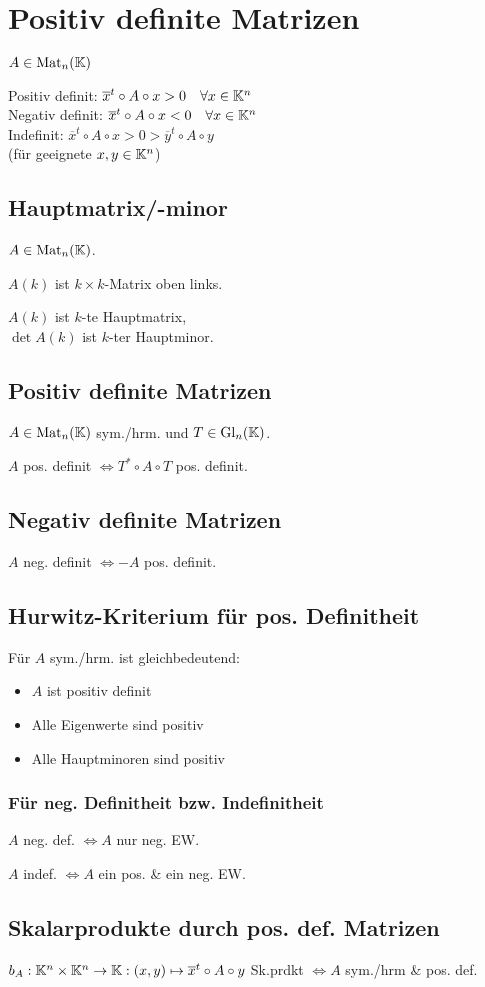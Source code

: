 \section*{Positiv definite Matrizen}
$A\in\operatorname{Mat}_n(\mathbb{K})$

Positiv definit: $\overline{x}^t \circ A \circ x > 0 \quad\forall x\in\mathbb{K}^n$ \\
Negativ definit: $\overline{x}^t \circ A \circ x < 0 \quad\forall x\in\mathbb{K}^n$ \\
Indefinit: $\overline{x}^t \circ A \circ x > 0 > \overline{y}^t \circ A \circ y$\\ (für geeignete $x,y\in\mathbb{K}^n$)

\subsection*{Hauptmatrix/-minor}
$A\in\operatorname{Mat}_n(\mathbb{K})$.

$A(k)$ ist $k\times k$-Matrix oben links.

$A(k)$ ist $k$-te Hauptmatrix,\\ $\det A(k)$ ist $k$-ter Hauptminor.

\subsection*{Positiv definite Matrizen}
$A\in\operatorname{Mat}_n(\mathbb{K})$ sym./hrm. und $T\in\operatorname{Gl}_n(\mathbb{K})$.

$A$ pos. definit $\iff T^* \circ A \circ T$ pos. definit.

\subsection*{Negativ definite Matrizen}
$A$ neg. definit $\iff -A$ pos. definit.

\subsection*{Hurwitz-Kriterium für pos. Definitheit}
Für $A$ sym./hrm. ist gleichbedeutend:
\begin{itemize}
	\item $A$ ist positiv definit
	\item Alle Eigenwerte sind positiv
	\item Alle Hauptminoren sind positiv
\end{itemize}

\subsubsection*{Für neg. Definitheit bzw. Indefinitheit}
$A$ neg. def. $\iff A$ nur neg. EW.

$A$ indef. $\iff A$ ein pos. \& ein neg. EW.

\subsection*{Skalarprodukte durch pos. def. Matrizen}
$b_A:\mathbb{K}^n \times \mathbb{K}^n \to \mathbb{K}: (x,y)\mapsto \overline{x}^t \circ A \circ y$
Sk.prdkt $\iff A$ sym./hrm \& pos. def.
